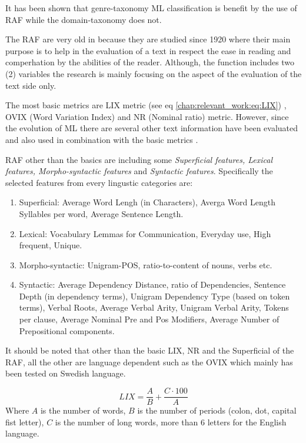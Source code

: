 It has been shown that genre-taxonomy ML classification is benefit by the use of RAF while the domain-taxonomy does not. 

The RAF are very old in because they are studied since 1920 where their main purpose is to help in the evaluation of a text in respect the ease in reading and comperhation by the abilities of the reader. Although, the function includes two (2) variables the research is mainly focusing on the aspect of the evaluation of the text side only. 

The most basic metrics are LIX metric (see eq \ref{chap:relevant_work:eq:LIX}) , OVIX (Word Variation Index) and NR (Nominal ratio) metric. However, since the evolution of ML there are several other text information have been evaluated and also used in combination with the basic metrics \parencite{falkenjack2013features}.

RAF other than the basics are including some \textit{Superficial features, Lexical features, Morpho-syntactic features} and \textit{Syntactic features}. Specifically the selected features from every lingustic categories are:

\begin{enumerate}
\item Superficial: Average Word Lengh (in Characters), Averga Word Length Syllables per word, Average Sentence Length.
\item Lexical: Vocabulary Lemmas for Communication, Everyday use, High frequent, Unique.
\item Morpho-syntactic: Unigram-POS, ratio-to-content of nouns, verbs etc.
\item Syntactic: Average Dependency Distance, ratio of Dependencies, Sentence Depth (in dependency terms), Unigram Dependency Type (based on token terms), Verbal Roots, Average Verbal Arity, Unigram Verbal Arity, Tokens per clause, Average Nominal Pre and Pos Modifiers, Average Number of Prepositional components.
\end{enumerate}

It should be noted that other than the basic LIX, NR and the Superficial of the RAF, all the other are language dependent such as the OVIX which mainly has been tested on Swedish language.

\begin{equation} \label{chap:relevant_work:eq:LIX}
	LIX = \frac{A}{B} + \frac{C \cdot 100}{A}
\end{equation}
Where $A$ is the number of words, $B$ is the number of periods (colon, dot, capital fist letter), $C$ is the number of long words, more than 6 letters for the English language. 

